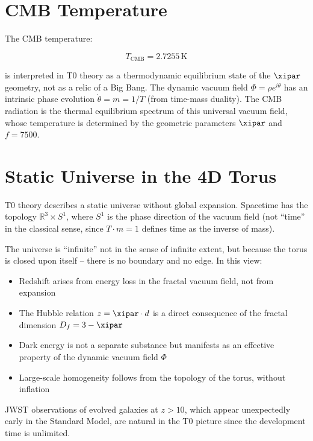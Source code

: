 \section{CMB Temperature}

The CMB temperature:

\begin{equation}
T_{\text{CMB}} = 2.7255\,\text{K}
\end{equation}

is interpreted in T0 theory as a thermodynamic equilibrium state of the 
$\xipar$ geometry, not as a relic of a Big Bang. The dynamic vacuum field 
$\Phi = \rho e^{i\theta}$ has an intrinsic phase evolution $\dot{\theta} = m 
= 1/T$ (from time-mass duality). The CMB radiation is the thermal equilibrium 
spectrum of this universal vacuum field, whose temperature is determined by the 
geometric parameters $\xipar$ and $f = 7500$.

\section{Static Universe in the 4D Torus}

T0 theory describes a static universe without global expansion. Spacetime 
has the topology $\mathbb{R}^3 \times S^1$, where $S^1$ is the phase 
direction of the vacuum field (not ``time'' in the classical sense, since 
$T \cdot m = 1$ defines time as the inverse of mass).

The universe is ``infinite'' not in the sense of infinite extent, but because 
the torus is closed upon itself -- there is no boundary and no edge. In this 
view:

\begin{itemize}
\item Redshift arises from energy loss in the fractal vacuum field, not from 
expansion
\item The Hubble relation $z = \xipar \cdot d$ is a direct consequence of the 
fractal dimension $D_f = 3 - \xipar$
\item Dark energy is not a separate substance but manifests as an effective 
property of the dynamic vacuum field $\Phi$
\item Large-scale homogeneity follows from the topology of the torus, without 
inflation
\end{itemize}

JWST observations of evolved galaxies at $z > 10$, which appear unexpectedly 
early in the Standard Model, are natural in the T0 picture since the 
development time is unlimited.

